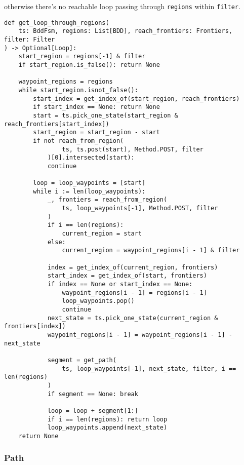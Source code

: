 \documentclass[11pt]{article}
\newcommand{\minline}[1]{{\footnotesize \texttt{#1}}}
\begin{document}
otherwise there's no reachable loop passing through \minline{regions} within
\minline{filter}.

\begin{verbatim}
def get_loop_through_regions(
    ts: BddFsm, regions: List[BDD], reach_frontiers: Frontiers, filter: Filter
) -> Optional[Loop]:
    start_region = regions[-1] & filter
    if start_region.is_false(): return None

    waypoint_regions = regions
    while start_region.isnot_false():
        start_index = get_index_of(start_region, reach_frontiers)
        if start_index == None: return None
        start = ts.pick_one_state(start_region & reach_frontiers[start_index])
        start_region = start_region - start
        if not reach_from_region(
                ts, ts.post(start), Method.POST, filter
            )[0].intersected(start):
            continue

        loop = loop_waypoints = [start]
        while i := len(loop_waypoints):
            _, frontiers = reach_from_region(
                ts, loop_waypoints[-1], Method.POST, filter
            )
            if i == len(regions):
                current_region = start
            else:
                current_region = waypoint_regions[i - 1] & filter

            index = get_index_of(current_region, frontiers)
            start_index = get_index_of(start, frontiers)
            if index == None or start_index == None:
                waypoint_regions[i - 1] = regions[i - 1]
                loop_waypoints.pop()
                continue
            next_state = ts.pick_one_state(current_region & frontiers[index])
            waypoint_regions[i - 1] = waypoint_regions[i - 1] - next_state

            segment = get_path(
                ts, loop_waypoints[-1], next_state, filter, i == len(regions)
            )
            if segment == None: break

            loop = loop + segment[1:]
            if i == len(regions): return loop
            loop_waypoints.append(next_state)
    return None
\end{verbatim}

\subsubsection{Path}
\end{document}
